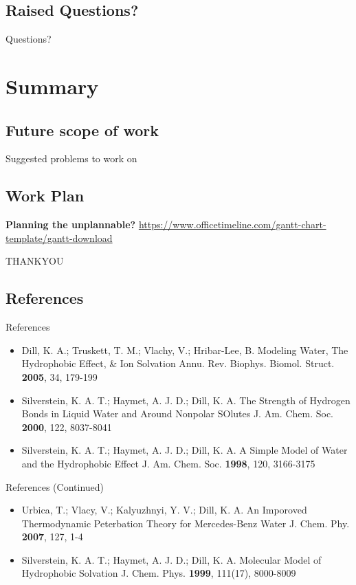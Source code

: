 \documentclass{beamer}
\begin{document}
\subsection{Raised Questions?}
\begin{frame}{Questions?}

\end{frame}

\section{Summary}
\subsection{Future scope of work}
\begin{frame}{Suggested problems to work on}

\end{frame}
\subsection{Work Plan}
\begin{frame}{\textbf{Planning the unplannable?}}
\url{https://www.officetimeline.com/gantt-chart-template/gantt-download}

\end{frame}

\begin{frame}
\centering \LARGE THANKYOU
\end{frame}

\subsection{References}
\begin{frame}{References}
\begin{itemize}
  \item Dill, K. A.; Truskett, T. M.; Vlachy, V.; Hribar-Lee, B. Modeling Water, The Hydrophobic Effect, \& Ion Solvation Annu. Rev. Biophys. Biomol. Struct. \textbf{2005}, 34, 179-199
  \item Silverstein, K. A. T.; Haymet, A. J. D.; Dill, K. A. The Strength of Hydrogen Bonds in Liquid Water and Around Nonpolar SOlutes J. Am. Chem. Soc. \textbf{2000}, 122, 8037-8041
  \item Silverstein, K. A. T.; Haymet, A. J. D.; Dill, K. A. A Simple Model of Water and the Hydrophobic Effect J. Am. Chem. Soc. \textbf{1998}, 120, 3166-3175
\end{itemize}
\end{frame}

\begin{frame}{References (Continued)}
\begin{itemize}
  \item Urbica, T.; Vlacy, V.; Kalyuzhnyi, Y. V.; Dill, K. A. An Imporoved Thermodynamic Peterbation Theory for Mercedes-Benz Water J. Chem. Phy. \textbf{2007}, 127, 1-4
  \item Silverstein, K. A. T.; Haymet, A. J. D.; Dill, K. A. Molecular Model of Hydrophobic Solvation J. Chem. Phys. \textbf{1999}, 111(17), 8000-8009 
\end{itemize}
\end{frame}
\end{document}
